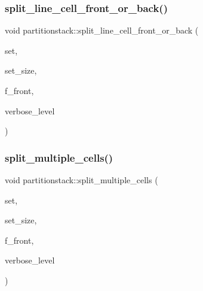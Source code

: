 \mbox{\label{classpartitionstack_a64a83c8573dc01d3593ab3f0e21c4255}} 
\subsubsection{\texorpdfstring{split\+\_\+line\+\_\+cell\+\_\+front\+\_\+or\+\_\+back()}{split\_line\_cell\_front\_or\_back()}}
{\footnotesize\ttfamily void partitionstack\+::split\+\_\+line\+\_\+cell\+\_\+front\+\_\+or\+\_\+back (\begin{DoxyParamCaption}\item[{\mbox{\hyperlink{galois_8h_a09fddde158a3a20bd2dcadb609de11dc}{I\+NT}} $\ast$}]{set,  }\item[{\mbox{\hyperlink{galois_8h_a09fddde158a3a20bd2dcadb609de11dc}{I\+NT}}}]{set\+\_\+size,  }\item[{\mbox{\hyperlink{galois_8h_a09fddde158a3a20bd2dcadb609de11dc}{I\+NT}}}]{f\+\_\+front,  }\item[{\mbox{\hyperlink{galois_8h_a09fddde158a3a20bd2dcadb609de11dc}{I\+NT}}}]{verbose\+\_\+level }\end{DoxyParamCaption})}

\mbox{\label{classpartitionstack_a7d0e8c56b61126fcd12e936d9e6e575e}} 
\subsubsection{\texorpdfstring{split\+\_\+multiple\+\_\+cells()}{split\_multiple\_cells()}}
{\footnotesize\ttfamily void partitionstack\+::split\+\_\+multiple\+\_\+cells (\begin{DoxyParamCaption}\item[{\mbox{\hyperlink{galois_8h_a09fddde158a3a20bd2dcadb609de11dc}{I\+NT}} $\ast$}]{set,  }\item[{\mbox{\hyperlink{galois_8h_a09fddde158a3a20bd2dcadb609de11dc}{I\+NT}}}]{set\+\_\+size,  }\item[{\mbox{\hyperlink{galois_8h_a09fddde158a3a20bd2dcadb609de11dc}{I\+NT}}}]{f\+\_\+front,  }\item[{\mbox{\hyperlink{galois_8h_a09fddde158a3a20bd2dcadb609de11dc}{I\+NT}}}]{verbose\+\_\+level }\end{DoxyParamCaption})}

